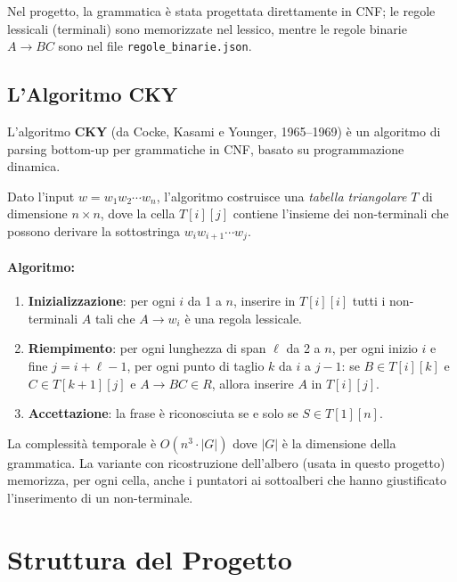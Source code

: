 \documentclass[12pt, a4paper]{article}
\begin{document}
Nel progetto, la grammatica è stata progettata direttamente in CNF; le regole
lessicali (terminali) sono memorizzate nel lessico, mentre le regole binarie
$A \rightarrow BC$ sono nel file \texttt{regole\_binarie.json}.

\subsection{L'Algoritmo CKY}

L'algoritmo \textbf{CKY} (da Cocke, Kasami e Younger, 1965--1969) è un algoritmo
di parsing bottom-up per grammatiche in CNF, basato su programmazione dinamica.

Dato l'input $w = w_1 w_2 \cdots w_n$, l'algoritmo costruisce una
\textit{tabella triangolare} $T$ di dimensione $n \times n$, dove la cella
$T[i][j]$ contiene l'insieme dei non-terminali che possono derivare la sottostringa
$w_i w_{i+1} \cdots w_j$.

\paragraph{Algoritmo:}
\begin{enumerate}
    \item \textbf{Inizializzazione}: per ogni $i$ da 1 a $n$, inserire in $T[i][i]$
          tutti i non-terminali $A$ tali che $A \rightarrow w_i$ è una regola lessicale.
    \item \textbf{Riempimento}: per ogni lunghezza di span $\ell$ da 2 a $n$, per ogni
          inizio $i$ e fine $j = i + \ell - 1$, per ogni punto di taglio $k$ da $i$ a
          $j-1$: se $B \in T[i][k]$ e $C \in T[k+1][j]$ e $A \rightarrow BC \in R$,
          allora inserire $A$ in $T[i][j]$.
    \item \textbf{Accettazione}: la frase è riconosciuta se e solo se $S \in T[1][n]$.
\end{enumerate}

La complessità temporale è $O(n^3 \cdot |G|)$ dove $|G|$ è la dimensione della
grammatica. La variante con ricostruzione dell'albero (usata in questo progetto)
memorizza, per ogni cella, anche i puntatori ai sottoalberi che hanno giustificato
l'inserimento di un non-terminale.

\section{Struttura del Progetto}
\end{document}
